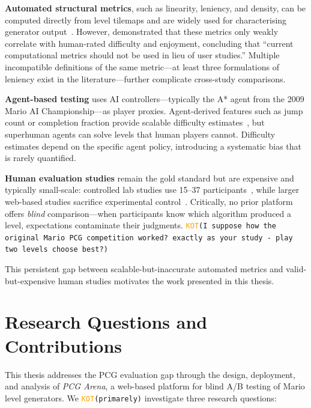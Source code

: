 \documentclass[shortabstract, mgr, english]{iithesis}
\newcommand{\DEBUG}[1]{{#1}} %
\newcommand{\KOT}[1]{\DEBUG{\tt{\textcolor{orange}{KOT}(}{#1}{)}}}
\begin{document}
\textbf{Automated structural metrics}, such as linearity, leniency, and density,
can be computed directly from level tilemaps and are widely used for
characterising generator output~\citep{smith2010analyzing, horn2014comparative}.
However, \citet{marino2015empirical} demonstrated that these metrics only weakly
correlate with human-rated difficulty and enjoyment, concluding that ``current
computational metrics should not be used in lieu of user studies.'' Multiple
incompatible definitions of the same metric---at least three formulations of
leniency exist in the literature---further complicate cross-study comparisons.

\textbf{Agent-based testing} uses AI controllers---typically the A* agent from
the 2009 Mario AI Championship---as player proxies. Agent-derived features such
as jump count or completion fraction provide scalable difficulty
estimates~\citep{volz2018evolving}, but superhuman agents can solve levels that
human players cannot. Difficulty estimates depend on the specific agent policy,
introducing a systematic bias that is rarely quantified.

\textbf{Human evaluation studies} remain the gold standard but are expensive and
typically small-scale: controlled lab studies use 15--37
participants~\citep{shaker2011mario, marino2015empirical}, while larger web-based
studies sacrifice experimental control~\citep{pedersen2010modeling}. Critically,
no prior platform offers \emph{blind} comparison---when participants know which
algorithm produced a level, expectations contaminate their judgments. \KOT{I suppose how the original Mario PCG competition worked? exactly as your study - play two levels choose best?}

This persistent gap between scalable-but-inaccurate automated metrics and
valid-but-expensive human studies motivates the work presented in this thesis.

\section{Research Questions and Contributions}
\label{sec:intro-rq}

This thesis addresses the PCG evaluation gap through the design, deployment, and
analysis of \emph{PCG Arena}, a web-based platform for blind A/B testing of
Mario level generators. We \KOT{primarely} investigate three research questions:
\end{document}
